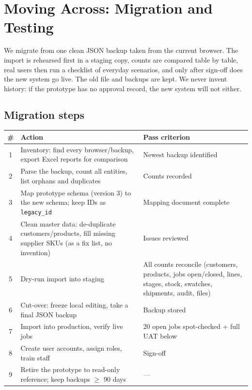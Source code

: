 \section{Moving Across: Migration and Testing}\label{sec:migration}

\begin{plainwords}
We migrate from one clean JSON backup taken from the current browser. The import is
rehearsed first in a staging copy, counts are compared table by table, real users then
run a checklist of everyday scenarios, and only after sign-off does the new system go
live. The old file and backups are kept. We never invent history: if the prototype has no
approval record, the new system will not either.
\end{plainwords}

\subsection*{Migration steps}

\begin{tabularx}{\textwidth}{@{}c X X@{}}
\toprule
\textbf{\#} & \textbf{Action} & \textbf{Pass criterion} \\
\midrule
1 & Inventory: find every browser/backup, export Excel reports for comparison &
  Newest backup identified \\
2 & Parse the backup, count all entities, list orphans and duplicates &
  Counts recorded \\
3 & Map prototype schema (version 3) to the new schema; keep IDs as
  \texttt{legacy\_id} & Mapping document complete \\
4 & Clean master data: de-duplicate customers/products, fill missing supplier SKUs
  (as a fix list, no invention) & Issues reviewed \\
5 & Dry-run import into staging & All counts reconcile (customers, products, jobs
  open/closed, lines, stages, stock, swatches, shipments, audit, files) \\
6 & Cut-over: freeze local editing, take a final JSON backup & Backup stored \\
7 & Import into production, verify live jobs & 20 open jobs spot-checked + full
  UAT below \\
8 & Create user accounts, assign roles, train staff & Sign-off \\
9 & Retire the prototype to read-only reference; keep backups $\ge$ 90 days & ---
\\
\bottomrule
\end{tabularx}


